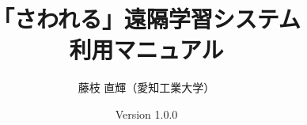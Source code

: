 \documentclass[a4j,11pt,oneside,openany]{ltjsbook}
\title{{\Huge 「さわれる」遠隔学習システム}\\利用マニュアル}
\author{藤枝 直輝（愛知工業大学）}
\date{Version 1.0.0}
\begin{document}
\maketitle
\frontmatter
\tableofcontents
\mainmatter









\nocite{*}



\appendix
%
%
%
\end{document}
